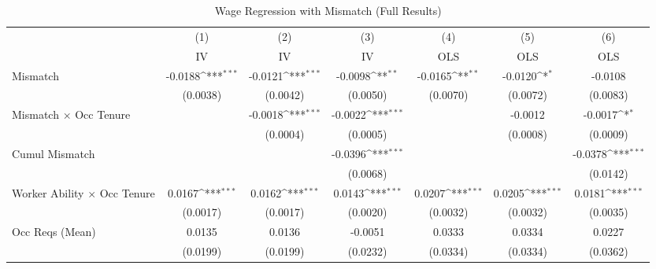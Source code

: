 {
\def\sym#1{\ifmmode^{#1}\else\(^{#1}\)\fi}
\begin{longtable}{l*{6}{c}}
\caption{Wage Regression with Mismatch (Full Results)}\\
\hline  \endfirsthead\hline  \endhead\hline  \endfoot\endlastfoot
                    &\multicolumn{1}{c}{(1)}&\multicolumn{1}{c}{(2)}&\multicolumn{1}{c}{(3)}&\multicolumn{1}{c}{(4)}&\multicolumn{1}{c}{(5)}&\multicolumn{1}{c}{(6)}\\
                    &\multicolumn{1}{c}{IV}&\multicolumn{1}{c}{IV}&\multicolumn{1}{c}{IV}&\multicolumn{1}{c}{OLS}&\multicolumn{1}{c}{OLS}&\multicolumn{1}{c}{OLS}\\
\hline  
Mismatch            &     -0.0188\sym{***}&     -0.0121\sym{***}&     -0.0098\sym{**} &     -0.0165\sym{**} &     -0.0120\sym{*}  &     -0.0108         \\
                    &    (0.0038)         &    (0.0042)         &    (0.0050)         &    (0.0070)         &    (0.0072)         &    (0.0083)         \\
Mismatch $\times$ Occ Tenure&                     &     -0.0018\sym{***}&     -0.0022\sym{***}&                     &     -0.0012         &     -0.0017\sym{*}  \\
                    &                     &    (0.0004)         &    (0.0005)         &                     &    (0.0008)         &    (0.0009)         \\
Cumul Mismatch      &                     &                     &     -0.0396\sym{***}&                     &                     &     -0.0378\sym{***}\\
                    &                     &                     &    (0.0068)         &                     &                     &    (0.0142)         \\
Worker Ability $\times$ Occ Tenure&      0.0167\sym{***}&      0.0162\sym{***}&      0.0143\sym{***}&      0.0207\sym{***}&      0.0205\sym{***}&      0.0181\sym{***}\\
                    &    (0.0017)         &    (0.0017)         &    (0.0020)         &    (0.0032)         &    (0.0032)         &    (0.0035)         \\
Occ Reqs (Mean)     &      0.0135         &      0.0136         &     -0.0051         &      0.0333         &      0.0334         &      0.0227         \\
                    &    (0.0199)         &    (0.0199)         &    (0.0232)         &    (0.0334)         &    (0.0334)         &    (0.0362)         \\

\end{longtable}}
